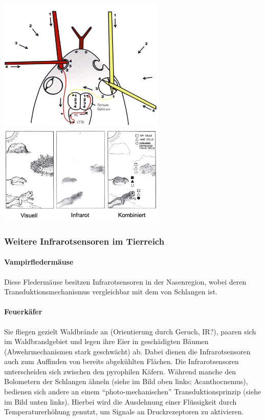 \begin{center}
    \includegraphics[width=8cm]{lec8/figures/sinne.png}
    \hfill
    \includegraphics[width=8cm]{lec8/figures/kombiniert.png}
\end{center}
 
 \subsubsection{Weitere Infrarotsensoren im Tierreich}

\paragraph{Vampirfledermäuse} Diese Fledermäuse besitzen Infrarotsensoren in der Nasenregion, wobei deren Transduktionsmechanismus vergleichbar mit dem von Schlangen ist. 

\paragraph{Feuerkäfer} Sie fliegen gezielt Waldbrände an (Orientierung durch Geruch, IR?), paaren sich im Waldbrandgebiet und legen ihre Eier in geschädigten Bäumen (Abwehrmechanismen stark geschwächt) ab. Dabei dienen die Infrarotsensoren auch zum Auffinden von bereits abgekühlten Flächen. Die Infrarotsensoren unterscheiden sich zwischen den pyrophilen Käfern. Während manche den Bolometern der Schlangen ähneln (siehe im Bild oben links; Acanthocnemus), bedienen sich andere an einem ``photo-mechanischen'' Transduktionsprinzip \dangersign (siehe im Bild unten links). Hierbei wird die Ausdehnung einer Flüssigkeit durch Temperaturerhöhung genutzt, um Signale an Druckrezeptoren zu aktivieren.

